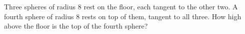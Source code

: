 Three spheres of radius $8$ rest on the floor, each tangent to the other two. A fourth sphere of radius $8$ rests on top of them, tangent to all three. How high above the floor is the top of the fourth sphere?
